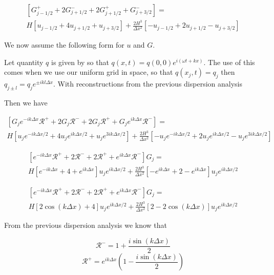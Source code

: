 \documentclass[12pt]{article}
\begin{document}
\begin{multline}
\left[G^+_{j- 1/2} +  2G^-_{j+ 1/2} +  2G^+_{j+ 1/2}  +  G^-_{j+ 3/2}\right] = \\ H\left[u_{j- 1/2} + 4u_{j+1/2} + u_{j+3/2}\right] +  \frac{2H^3}{\Delta x^2}\left[-u_{j- 1/2}  + 2u_{j+1/2} -  u_{j+3/2} \right]
\end{multline}

 

We now assume the following form for $u$ and $G$.

Let quantity $q$ is given by so that
$q(x,t) = q(0,0) e^{i\left(\omega t + kx\right)}$. The use of this comes when we use our uniform grid in space, so that $q(x_j,t) = q_j$ then $q_{j \pm l} = q_j e^{\pm ik l\Delta x} $. With reconstructions from the previous dispersion analysis

Then we have 

\begin{multline}
\left[ G_je^{- ik\Delta x} \mathcal{R}^+ +  2G_j \mathcal{R}^- +  2G_j \mathcal{R}^+  +  G_je^{ik\Delta x} \mathcal{R}^-\right] = \\ H\left[u_{j}e^{- ik\Delta x/2} + 4u_{j}e^{ ik\Delta x/2} + u_{j}e^{ 3ik\Delta x/2}\right] +  \frac{2H^3}{\Delta x^2}\left[-u_{j}e^{- ik\Delta x/2}  + 2u_{j}e^{ ik\Delta x/2} -  u_{j}e^{ 3ik\Delta x/2} \right]
\end{multline}

\begin{multline}
\left[e^{- ik\Delta x} \mathcal{R}^+ +  2 \mathcal{R}^- +  2 \mathcal{R}^+  +  e^{ik\Delta x} \mathcal{R}^-\right] G_j = \\ H\left[e^{- ik\Delta x} + 4 + e^{ ik\Delta x}\right] u_{j}e^{ ik\Delta x/2} +  \frac{2H^3}{\Delta x^2}\left[-e^{ik\Delta x}  + 2 -  e^{ik\Delta x} \right] u_{j}e^{ ik\Delta x/2}
\end{multline}

\begin{multline}
\left[e^{- ik\Delta x} \mathcal{R}^+ +  2 \mathcal{R}^- +  2 \mathcal{R}^+  +  e^{ik\Delta x} \mathcal{R}^-\right] G_j = \\ H\left[2 \cos \left(k\Delta x\right) + 4 \right] u_{j}e^{ ik\Delta x/2} +  \frac{2H^3}{\Delta x^2}\left[ 2 -  2\cos \left(k\Delta x\right) \right] u_{j}e^{ ik\Delta x/2}
\end{multline}

From the previous dispersion analysis we know that 

\[\mathcal{R}^- = 1  + \frac{i\sin\left(k\Delta x\right)}{2}\]
\[\mathcal{R}^+ = e^{ik\Delta x}\left(1  - \frac{i\sin\left(k\Delta x\right)}{2} \right)\]
\end{document}
